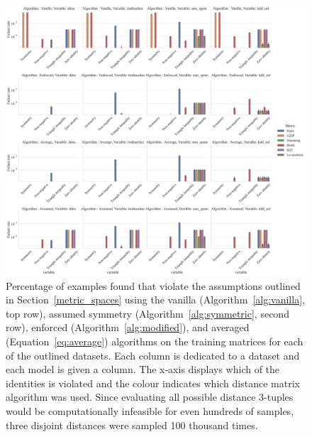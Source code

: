 \documentclass[conference]{IEEEtran}
\begin{document}
\begin{figure}[htb]
    \includegraphics[width=\textwidth]{images/read_world_check.pdf}
    \caption{Percentage of examples found that violate the assumptions outlined in Section~\ref{metric_spaces} using the vanilla (Algorithm~\ref{alg:vanilla}, top row), assumed symmetry (Algorithm~\ref{alg:symmetric}, second row), enforced (Algorithm~\ref{alg:modified}), and averaged (Equation~\ref{eq:average}) algorithms on the training matrices for each of the outlined datasets. Each column is dedicated to a dataset and each model is given a column. The x-axis displays which of the identities is violated and the colour indicates which distance matrix algorithm was used. Since evaluating all possible distance 3-tuples would be computationally infeasible for even hundreds of samples, three disjoint distances were sampled  100 thousand times.}
    \label{fig:real_world_check}
\end{figure}
\end{document}
